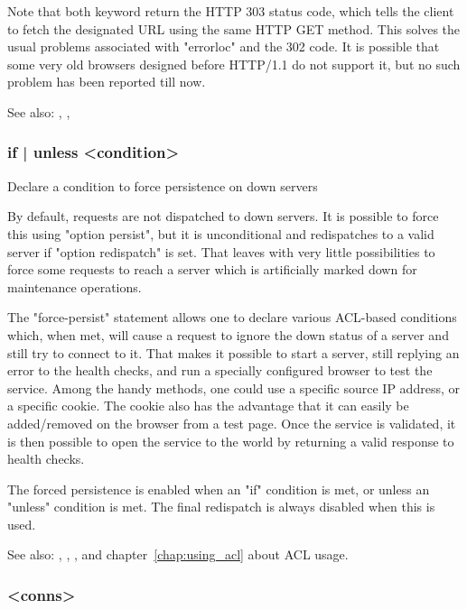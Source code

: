   Note that both keyword return the HTTP 303 status code, which tells the
  client to fetch the designated URL using the same HTTP GET method. This
  solves the usual problems associated with "errorloc" and the 302 code. It is
  possible that some very old browsers designed before HTTP/1.1 do not support
  it, but no such problem has been reported till now.

  See also: , , 

\subsubsection[force-persist]{ { if | unless } <condition>}

  Declare a condition to force persistence on down servers
  

  By default, requests are not dispatched to down servers. It is possible to
  force this using "option persist", but it is unconditional and redispatches
  to a valid server if "option redispatch" is set. That leaves with very little
  possibilities to force some requests to reach a server which is artificially
  marked down for maintenance operations.

  The "force-persist" statement allows one to declare various ACL-based
  conditions which, when met, will cause a request to ignore the down status of
  a server and still try to connect to it. That makes it possible to start a
  server, still replying an error to the health checks, and run a specially
  configured browser to test the service. Among the handy methods, one could
  use a specific source IP address, or a specific cookie. The cookie also has
  the advantage that it can easily be added/removed on the browser from a test
  page. Once the service is validated, it is then possible to open the service
  to the world by returning a valid response to health checks.

  The forced persistence is enabled when an "if" condition is met, or unless an
  "unless" condition is met. The final redispatch is always disabled when this
  is used.

  See also: , , ,
             and chapter~\ref{chap:using_acl} about ACL usage.

\subsubsection[fullconn]{ <conns>}

